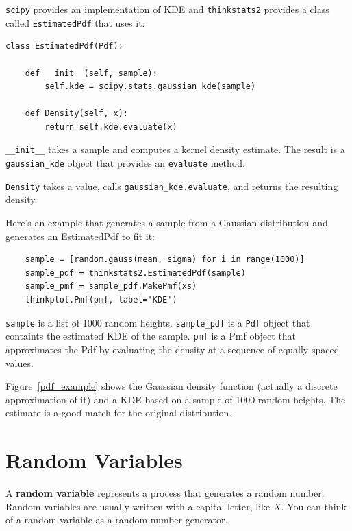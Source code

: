 \documentclass[12pt]{book}
\begin{document}
{\tt scipy} provides an implementation of KDE and {\tt thinkstats2}
provides a class called {\tt EstimatedPdf} that uses it:

\begin{verbatim}
class EstimatedPdf(Pdf):

    def __init__(self, sample):
        self.kde = scipy.stats.gaussian_kde(sample)

    def Density(self, x):
        return self.kde.evaluate(x)
\end{verbatim}

\verb"__init__" takes a sample
and computes a kernel density estimate.  The result is a
\verb"gaussian_kde" object that provides an {\tt evaluate}
method.

{\tt Density} takes a value, calls \verb"gaussian_kde.evaluate",
and returns the resulting density.

Here's an example that generates a sample from a Gaussian
distribution and generates an EstimatedPdf to fit it:

\begin{verbatim}
    sample = [random.gauss(mean, sigma) for i in range(1000)]
    sample_pdf = thinkstats2.EstimatedPdf(sample)
    sample_pmf = sample_pdf.MakePmf(xs)
    thinkplot.Pmf(pmf, label='KDE')
\end{verbatim}

\verb"sample" is a list of 1000 random heights.
\verb"sample_pdf" is a {\tt Pdf} object that containts the estimated
KDE of the sample.  {\tt pmf} is a Pmf object that approximates the Pdf by
evaluating the density at a sequence of equally spaced values.

Figure~\ref{pdf_example} shows the Gaussian density function (actually
a discrete approximation of it) and a KDE based on a sample of 1000
random heights.  The estimate is a good match for the original
distribution.



\section{Random Variables}

A {\bf random variable} represents a process that generates a random
number.  Random variables are usually written with a capital letter,
like $X$.  You can think of a random variable as a random number
generator.
\end{document}
